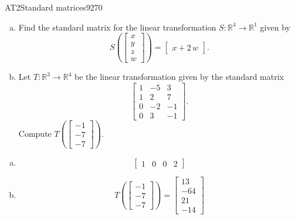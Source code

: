 \begin{exercise}{AT2}{Standard matrices}{9270} 
\begin{exerciseStatement} 

\begin{enumerate}[(a)]
\item Find the standard matrix for the linear transformation \(S:\mathbb{R}^4 \to \mathbb{R}^1\) given by \[S\left( \left[\begin{array}{c}
x \\
y \\
z \\
{w}
\end{array}\right] \right) = \left[\begin{array}{c}
x + 2 \, {w}
\end{array}\right].\] 
\item Let \(T:\mathbb{R}^3 \to \mathbb{R}^4\) be the linear transformation given by the standard matrix \[\left[\begin{array}{ccc}
1 & -5 & 3 \\
1 & 2 & 7 \\
0 & -2 & -1 \\
0 & 3 & -1
\end{array}\right].\] Compute \(T\left(\left[\begin{array}{c}
-1 \\
-7 \\
-7
\end{array}\right]\right)\). 
\end{enumerate}

     \end{exerciseStatement}
 \begin{exerciseAnswer} 

\begin{enumerate}[(a)]
\item  \[\left[\begin{array}{cccc}
1 & 0 & 0 & 2
\end{array}\right]\] 
\item  \[T\left(\left[\begin{array}{c}
-1 \\
-7 \\
-7
\end{array}\right]\right)=\left[\begin{array}{c}
13 \\
-64 \\
21 \\
-14
\end{array}\right]\] 
\end{enumerate}

     \end{exerciseAnswer}
 \end{exercise}


